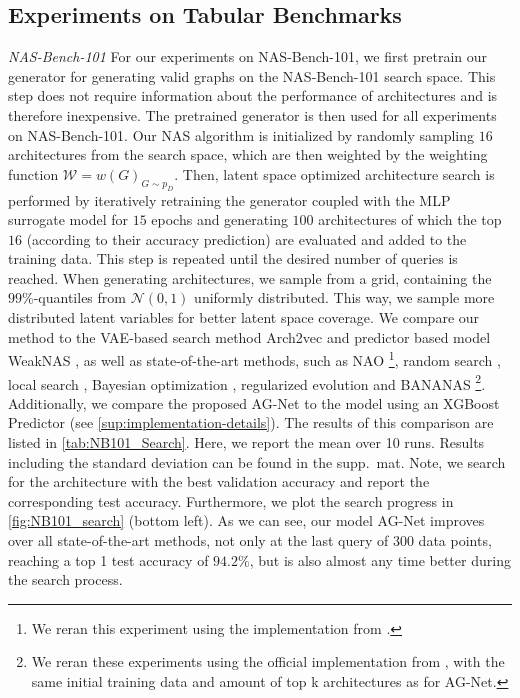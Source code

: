 \documentclass[runningheads]{llncs}
\begin{document}
\subsection{Experiments on Tabular Benchmarks}\label{sec:tabluar_benchmark_experiments}
\noindent \textit{NAS-Bench-101}
For our experiments on NAS-Bench-101, we first pretrain our generator for generating valid graphs on the NAS-Bench-101 search space.
This step does not require information about the performance of architectures and is therefore inexpensive.
The pretrained generator is then used for all experiments on NAS-Bench-101.
Our NAS algorithm is initialized by randomly sampling $16$ architectures from the search space, which are then weighted by the weighting function $\mathcal{W} = {w(G)}_{G \sim p_D}$. Then, latent space optimized architecture search is performed by iteratively retraining the generator coupled with the MLP surrogate model for $15$ epochs and generating $100$ architectures of which the top $16$ (according to their accuracy prediction) are evaluated and added to the training data.
This step is repeated until the desired number of queries is reached.
When generating architectures, we sample from a grid, containing the $99 \%$-quantiles from $\mathcal{N}(0,1)$ uniformly distributed.
This way, we sample more distributed latent variables for better latent space coverage.  We compare our method to the VAE-based search method Arch2vec \cite{2020Arch2vec} and predictor based model WeakNAS \cite{2021WeakNAS}, as well as state-of-the-art methods, such as NAO \cite{2018NAO}\footnote[3]{We reran this experiment using the implementation from \cite{2021HowPP}.},  random search \cite{2019RS}, local search \cite{2020LocalSearchNAS}, Bayesian optimization \cite{2015DNGO}, regularized evolution \cite{2019EvolutionaryNAS} and BANANAS \cite{2021BANANAS}\footnote[2]{We reran these experiments using the official implementation from \cite{2020Study,2021BANANAS,2020LocalSearchNAS}, with the same initial training data and amount of top k architectures as for AG-Net.}.
Additionally, we compare the proposed AG-Net to the model using an XGBoost Predictor (see \autoref{sup:implementation-details}).
The results of this comparison are listed in \autoref{tab:NB101_Search}.
Here, we report the mean over 10 runs. Results including the standard deviation can be found in the supp.~mat.
Note, we search for the architecture with the best validation accuracy and report the corresponding test accuracy.
Furthermore, we plot the search progress in \autoref{fig:NB101_search} (bottom left).
As we can see, our model AG-Net improves over all state-of-the-art methods, not only at the last query of $300$ data points, reaching a top 1 test accuracy of $94.2 \%$, but is also almost any time better during the search process.
\end{document}
